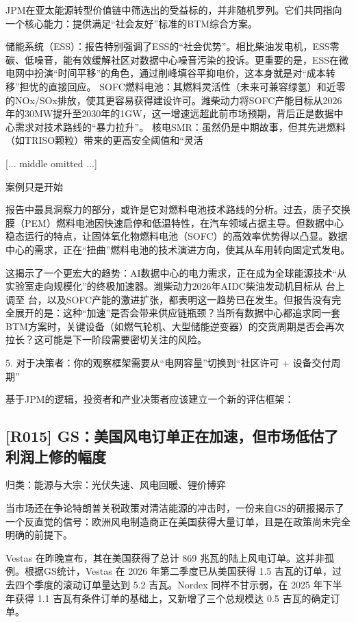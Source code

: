 \documentclass[11pt]{ctexart}
\begin{document}
JPM在亚太能源转型价值链中筛选出的受益标的，并非随机罗列。它们共同指向一个核心能力：提供满足“社会友好”标准的BTM综合方案。

储能系统（ESS）：报告特别强调了ESS的“社会优势”。相比柴油发电机，ESS零碳、低噪音，能有效缓解社区对数据中心噪音污染的投诉。更重要的是，ESS在微电网中扮演“时间平移”的角色，通过削峰填谷平抑电价，这本身就是对“成本转移”担忧的直接回应。 SOFC燃料电池：其燃料灵活性（未来可兼容绿氢）和近零的NOx/SOx排放，使其更容易获得建设许可。潍柴动力将SOFC产能目标从2026年的30MW提升至2030年的1GW，这一增速远超此前市场预期，背后正是数据中心需求对技术路线的“暴力拉升”。 核电SMR：虽然仍是中期故事，但其先进燃料（如TRISO颗粒）带来的更高安全阈值和“灵活

[... middle omitted ...]

案例只是开始

报告中最具洞察力的部分，或许是它对燃料电池技术路线的分析。过去，质子交换膜（PEM）燃料电池因快速启停和低温特性，在汽车领域占据主导。但数据中心稳态运行的特点，让固体氧化物燃料电池（SOFC）的高效率优势得以凸显。数据中心的需求，正在“扭曲”燃料电池的技术演进方向，使其从车用转向固定式发电。

这揭示了一个更宏大的趋势：AI数据中心的电力需求，正在成为全球能源技术“从实验室走向规模化”的终极加速器。潍柴动力2026年AIDC柴油发动机目标从 台上调至 台，以及SOFC产能的激进扩张，都表明这一趋势已在发生。但报告没有完全展开的是：这种“加速”是否会带来供应链瓶颈？当所有数据中心都追求同一套BTM方案时，关键设备（如燃气轮机、大型储能逆变器）的交货周期是否会再次拉长？这可能是下一阶段需要密切关注的风险。

5. 对于决策者：你的观察框架需要从“电网容量”切换到“社区许可 + 设备交付周期”

基于JPM的逻辑，投资者和产业决策者应该建立一个新的评估框架：

\subsection{[R015] GS：美国风电订单正在加速，但市场低估了利润上修的幅度}
{\small\color{refgray}归类：能源与大宗：光伏失速、风电回暖、锂价博弈}

当市场还在争论特朗普关税政策对清洁能源的冲击时，一份来自GS的研报揭示了一个反直觉的信号：欧洲风电制造商正在美国获得大量订单，且是在政策尚未完全明确的前提下。

Vestas 在昨晚宣布，其在美国获得了总计 869 兆瓦的陆上风电订单。这并非孤例。根据GS统计，Vestas 在 2026 年第二季度已从美国获得 1.5 吉瓦的订单，过去四个季度的滚动订单量达到 5.2 吉瓦。Nordex 同样不甘示弱，在 2025 年下半年获得 1.1 吉瓦有条件订单的基础上，又新增了三个总规模达 0.5 吉瓦的确定订单。
\end{document}
